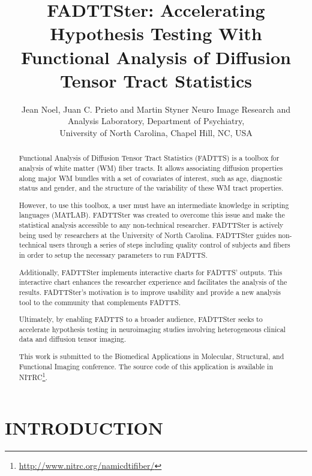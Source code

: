 \documentclass[]{spie}  %
\title{FADTTSter: Accelerating Hypothesis Testing With Functional Analysis of Diffusion Tensor Tract Statistics}
\author{Jean Noel\supit{1}, Juan C. Prieto\supit{1} and Martin Styner\supit{1}
\skiplinehalf
\supit{1}Neuro Image Research and Analysis Laboratory, Department of Psychiatry,\\University of North Carolina, Chapel Hill, NC, USA
}
\begin{document}
 
\maketitle 

\begin{abstract}

Functional Analysis of Diffusion Tensor Tract Statistics (FADTTS) 
is a toolbox for analysis of white matter (WM) fiber tracts. 
It allows associating diffusion properties along major WM bundles 
with a set of covariates of interest, such as age, diagnostic status and gender, 
and the structure of the variability of these WM tract 
properties.

However, to use this toolbox, a user must have an intermediate knowledge in scripting languages (MATLAB). 
FADTTSter was created to overcome this issue and make the statistical analysis accessible to any 
non-technical researcher. FADTTSter is actively being used by researchers at the University of North Carolina. 
FADTTSter guides non-technical users through a series of steps including quality control of subjects and fibers in order
to setup the necessary parameters to run FADTTS. 

Additionally, FADTTSter implements interactive charts for FADTTS' outputs. This interactive chart enhances 
the researcher experience and facilitates the analysis of the results. 
FADTTSter's motivation is to improve usability and provide a new analysis tool to the community that complements FADTTS.

Ultimately, by enabling FADTTS to a broader audience, FADTTSter seeks to accelerate hypothesis testing in neuroimaging studies involving heterogeneous clinical data and diffusion tensor imaging.

This work is submitted to the Biomedical Applications in Molecular, Structural, and Functional Imaging conference. 
The source code of this application is available in NITRC\footnote{\url{http://www.nitrc.org/namicdtifiber/}}.

\end{abstract}


\section{INTRODUCTION}
\label{sec:intro}
\end{document}
